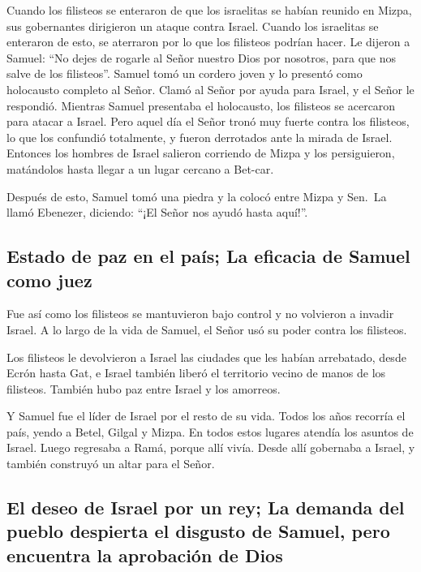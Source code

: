  Cuando los filisteos se enteraron de que los israelitas
se habían reunido en Mizpa, sus gobernantes dirigieron un ataque contra
Israel. Cuando los israelitas se enteraron de esto, se aterraron por lo
que los filisteos podrían hacer.  Le dijeron a Samuel:
``No dejes de rogarle al Señor nuestro Dios por nosotros, para que nos
salve de los filisteos''.  Samuel tomó un cordero joven y
lo presentó como holocausto completo al Señor. Clamó al Señor por ayuda
para Israel, y el Señor le respondió.  Mientras Samuel
presentaba el holocausto, los filisteos se acercaron para atacar a
Israel. Pero aquel día el Señor tronó muy fuerte contra los filisteos,
lo que los confundió totalmente, y fueron derrotados ante la mirada de
Israel.  Entonces los hombres de Israel salieron
corriendo de Mizpa y los persiguieron, matándolos hasta llegar a un
lugar cercano a Bet-car.

 Después de esto, Samuel tomó una piedra y la colocó
entre Mizpa y Sen.~La llamó Ebenezer, diciendo: ``¡El Señor nos ayudó
hasta aquí!''.

\hypertarget{estado-de-paz-en-el-pauxeds-la-eficacia-de-samuel-como-juez}{%
\subsection{Estado de paz en el país; La eficacia de Samuel como
juez}\label{estado-de-paz-en-el-pauxeds-la-eficacia-de-samuel-como-juez}}

 Fue así como los filisteos se mantuvieron bajo control y
no volvieron a invadir Israel. A lo largo de la vida de Samuel, el Señor
usó su poder contra los filisteos.

 Los filisteos le devolvieron a Israel las ciudades que
les habían arrebatado, desde Ecrón hasta Gat, e Israel también liberó el
territorio vecino de manos de los filisteos. También hubo paz entre
Israel y los amorreos.

 Y Samuel fue el líder de Israel por el resto de su vida.
 Todos los años recorría el país, yendo a Betel, Gilgal y
Mizpa. En todos estos lugares atendía los asuntos de Israel.
 Luego regresaba a Ramá, porque allí vivía. Desde allí
gobernaba a Israel, y también construyó un altar para el Señor.

\hypertarget{el-deseo-de-israel-por-un-rey-la-demanda-del-pueblo-despierta-el-disgusto-de-samuel-pero-encuentra-la-aprobaciuxf3n-de-dios}{%
\subsection{El deseo de Israel por un rey; La demanda del pueblo
despierta el disgusto de Samuel, pero encuentra la aprobación de
Dios}\label{el-deseo-de-israel-por-un-rey-la-demanda-del-pueblo-despierta-el-disgusto-de-samuel-pero-encuentra-la-aprobaciuxf3n-de-dios}}

